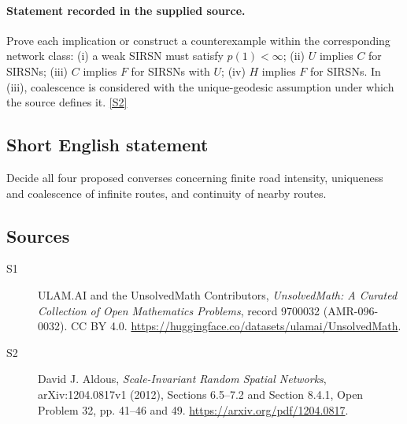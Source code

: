 \documentclass[11pt]{article}
\newcommand{\sref}[2]{\hyperlink{source:#1:#2}{[S#2]}}
\begin{document}
\paragraph{Statement recorded in the supplied source.}
Prove each implication or construct a counterexample within the corresponding network class: (i) a weak SIRSN must satisfy $p(1)<\infty$; (ii) $U$ implies $C$ for SIRSNs; (iii) $C$ implies $F$ for SIRSNs with $U$; (iv) $H$ implies $F$ for SIRSNs. In (iii), coalescence is considered with the unique-geodesic assumption under which the source defines it. \sref{9700032}{2}
\subsection{Short English statement}
Decide all four proposed converses concerning finite road intensity, uniqueness and coalescence of infinite routes, and continuity of nearby routes.
\subsection{Sources}
\begin{description}
\item[\hypertarget{source:9700032:1}{S1}] ULAM.AI and the UnsolvedMath Contributors, \emph{UnsolvedMath: A Curated Collection of Open Mathematics Problems}, record 9700032 (AMR-096-0032). CC BY 4.0. \url{https://huggingface.co/datasets/ulamai/UnsolvedMath}.
\item[\hypertarget{source:9700032:2}{S2}] David J. Aldous, \emph{Scale-Invariant Random Spatial Networks}, arXiv:1204.0817v1 (2012), Sections 6.5--7.2 and Section 8.4.1, Open Problem 32, pp. 41--46 and 49. \url{https://arxiv.org/pdf/1204.0817}.
\end{description}
\label{end:9700032}
\end{document}
